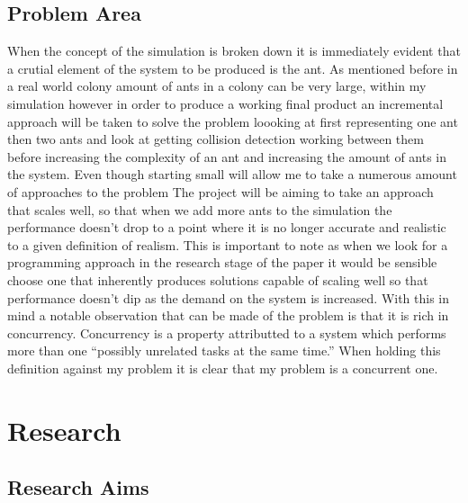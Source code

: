 \documentclass{report}
\begin{document}
\section{Problem Area}
When the concept of the simulation is broken down it is immediately evident that a crutial element of the system to be produced is the ant. As mentioned before in a real world colony amount of ants in a colony can be very large, within my simulation however in order to produce a working final product an incremental approach will be taken to solve the problem loooking at first representing one ant then two ants and look at getting collision detection working between them before increasing the complexity of an ant and increasing the amount of ants in the system. Even though starting small will allow me to take a numerous amount of approaches to the problem The project will be aiming to take an approach that scales well, so that when we add more ants to the simulation the performance doesn't drop to a point where it is no longer accurate and realistic to a given definition of realism. This is important to note as when we look for a programming approach in the research stage of the paper it would be sensible choose one that inherently produces solutions capable of scaling well so that performance doesn't dip as the demand on the system is increased. With this in mind a notable observation that can be made of the problem is that it is rich in concurrency. Concurrency is a property attributted to a system which performs more than one ``possibly unrelated tasks at the same time.'' \cite{OSullivan2008} When holding this definition against my problem it is clear that my problem is a concurrent one.

\chapter{Research}
\section {Research Aims}
\end{document}
